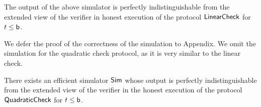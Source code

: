 \begin{comment}
The simulator outputs $r$, $\{j_u,k_u\}_{u\in [t]}$,
$\beta$, $\tau,\delta$, $\rho$, $\tilde{\tau},\tilde{\delta}$ by uniformly and
independently sampling them from their respective domains, as in the honest
execution of the protocol. Simulator also outputs $z,\tilde{z}$ uniformly from
$L_2$, and $z'$ uniformly from $\dashL_2$ satisfying $\sum_{j\in [m]}z'[j]=0$ . It outputs
$\ewit[\cdot,\cdot,k_u]$ uniformly such that each plane has columns as codewords
in $L_2$. 
Next, the simulator outputs $\omega,\nu,\tilde{\nu}$
and $\chi_1,\ldots,\chi_t$, $\{O[\cdot,k_u]\}_{u\in [t]}$ choosing them randomly and
independently from $\FF$. Finally, the simulator outputs
$c_0,d_0,\ldots,c_{s+\ell}$ and $\tilde{d}_0,\tilde{c}_1,\ldots,\tilde{c}_\ell$ choosing 
them uniformly from $\GG$ subject to the following constraints:
$d_0 + \sum_{a=1}^{s+\ell}\mu_ac_a = \comm(z,\nu)$,
$c_0 + \sum_{a=1}^{s+\ell}\varphi_ac_a = \comm(z',\omega)$,
$\sum_{a=1}^{s+\ell}T[a,k_u]c_a = \comm(P[\cdot,k_u],\chi_u)$ for $u\in [t]$,
$\sum_{a=1}^{\ell}\mc{T}[a,k_u]\tilde{c}_a = \comm\big(\sum_{i\in
[p]}\tilde{U}[\cdot,k_u],\tilde{O}[\cdot, k_u]\big)$ for $u\in [t]$,
$\beta\tilde{d}_0 + \sum_{a=1}^{\ell}\tilde{\mu}_a\tilde{c}_a =
\comm(\tilde{z},\tilde{\nu})$. 
\end{comment}
\begin{lemma}\label{lem:simlincheck}
The output of the above simulator is perfectly indistinguishable
from the extended view of the verifier in honest execution of the protocol
$\mathsf{LinearCheck}$ for $t\leq \mathsf{b}$.
\end{lemma}
We defer the proof of the correctness of the simulation to Appendix.
We omit the simulation for the quadratic check protocol, as it is very similar
to the linear check. 

\begin{lemma}\label{lem:simquadcheck}
There exists an efficient simulator $\mathsf{Sim}$ whose output is perfectly
indistinguishable from the extended view of the verifier in the honest execution
of the protocol $\mathsf{QuadraticCheck}$ for $t\leq \mathsf{b}$.
\end{lemma}


